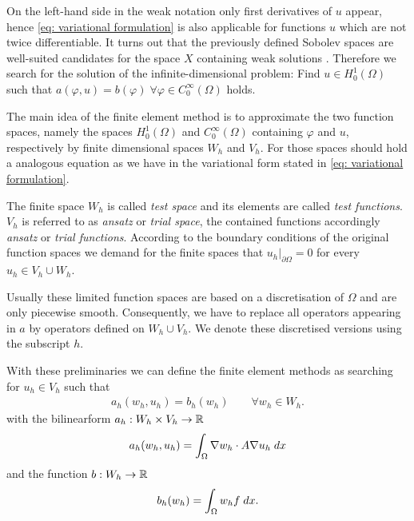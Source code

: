 On the left-hand side in the weak notation only first derivatives of $u$ appear, hence \eqref{eq: variational formulation} is also applicable for functions $u$ which are not twice differentiable. It turns out that the previously defined Sobolev spaces are well-suited candidates for the space $X$ containing weak solutions \cite[Chapter 1]{BS2002}. Therefore we search for the solution of the infinite-dimensional problem: Find $u\in H_0^1(\Omega)$ such that  $a(\varphi,u)  = b(\varphi) \;\forall \varphi \in C_0^\infty(\Omega)$ holds. %

The main idea of the finite element method is to approximate the two function spaces, namely the spaces $H_0^1(\Omega)$ and $C_0^\infty(\Omega)$ containing $\varphi$ and $u$, respectively by finite dimensional spaces $W_h$ and $V_h$. For those spaces should hold a analogous equation as we have in the variational form stated in \eqref{eq: variational formulation}.

The finite space $W_h$ is called \emph{test space} and its elements are called \emph{test functions}. $V_h$ is referred to as \emph{ansatz} or \emph{trial space}, the contained functions accordingly \emph{ansatz} or \emph{trial functions}. According to the boundary conditions of the original function spaces we demand for the finite spaces that $u_h|_{\partial \Omega} = 0$ for every $u_h \in V_h \cup W_h$.

Usually these limited function spaces are based on a discretisation of $\Omega$ and are only piecewise smooth. Consequently, we have to replace all operators appearing in $a$ by operators defined on $W_h \cup V_h$. We denote these discretised versions using the subscript $h$.

With these preliminaries we can define the finite element methods as searching for $u_h \in V_h$ such that 
\begin{align}
a_h(w_h,u_h) = b_h(w_h) \qquad \forall w_h \in W_h. \label{eq: FE variational formulation}
\end{align}
with the bilinearform  $a_h:W_h \times V_h \rightarrow \mathbb{R}$
\begin{align*}
a_h(w_h,u_h)  = \myIntX  \Omega { \nabla w_h  \cdot A\nabla u_h} %
\end{align*}
and the function $b:W_h \rightarrow \mathbb{R}$
\begin{align*}
b_h(w_h) = \int_{\Omega} {{ w_h f}\;dx}.
\end{align*}

